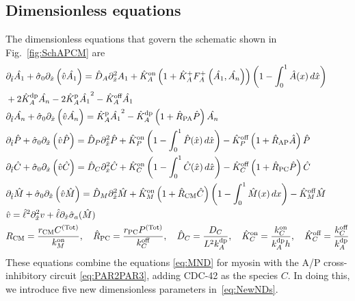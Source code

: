 \documentclass[11pt]{article}
\newcommand{\6}[1]{#1_{\text{6}}}
\newcommand{\3}[1]{#1_{\text{3}}}
\newcommand{\Tot}[1]{#1^\text{(Tot)}}
\newcommand{\A}[1]{#1_A}
\begin{document}
\subsection{Dimensionless equations}
The dimensionless equations that govern the schematic shown in Fig.\ \ref{fig:SchAPCM} are 
\begin{subequations}
\label{eq:Everything}
\begin{align}
\nonumber
&\Dthat \hat{\MA}  +\hat{\sigma}_0  \Dxhat \left(\hat{v} \hat{\MA} \right) = \DhatA \Dxhat^2 \MA +\KhatonA \left(1+\KhatfA \A{F}^+\left(\hat{\MA},\hat{\PA}\right)\right)\left(1 - \int_0^1 \hat{A}(x) \, d\hat{x} \right) \\ 
&+ 2\KhatdpA \hat{\PA}-2\KhatpA \hat{\MA}^2 - \KhatoffA \hat{\MA} \\ 
&\Dthat \hat{\PA} +\hat{\sigma}_0  \Dxhat \left(\hat{v} \hat{\PA} \right)  =\KhatpA \hat{\MA}^2- \KhatdpA \left(1+\hat{R}_\text{PA}\hat{P}\right) \hat{\PA} \\ 
&\Dthat \hat{P} +\hat{\sigma}_0  \Dxhat \left(\hat{v} \hat{P} \right)   =\DhatP \Dxhat^2 \hat{P} +\KhatonP \left(1 - \int_0^1 \hat{P}(\hat x) \, d\hat{x} \right)  - \KhatoffP \left(1+\hat{R}_\text{AP}\hat A\right) \hat{P} \\ 
\label{eq:26c}
&\Dthat \hat{C} +\hat{\sigma}_0  \Dxhat \left(\hat{v} \hat{C} \right) =\DhatC \Dxhat^2 \hat{C} +\KhatonC \left(1 - \int_0^1 \hat{C}(\hat x) \, d\hat{x} \right)  - \KhatoffC \left(1+\hat{R}_\text{PC}\hat P\right)\hat{C} \\ 
&\Dthat \hat{M} +\hat{\sigma}_0  \Dxhat \left(\hat{v} \hat{M} \right) =\hat{D}_M \Dxhat^2 \hat{M} +\KhatonM \left(1+\hat{R}_\text{CM} \hat C\right) \left(1-\int_0^1  \hat{M}(x) \, dx\right)- \KhatoffM \hat{M}\\
&\hat{v} = \hat{\ell}^2 \Dxhat^2 v +\hat{\ell} \Dxhat \hat{\sigma}_a(\hat{M})\\
\label{eq:NewNDs}
&R_\text{CM}=\frac{r_\text{CM}\Tot{C}}{\kon_M},\quad \hat{R}_\text{PC}=\frac{r_\text{PC}\Tot{P}}{\koff_C},\quad \DhatC=\frac{D_C}{L^2 \kdp_A},\quad \KhatonC=\frac{\kon_C}{\kdp_A h},\quad \KhatoffC=\frac{\koff_C}{\kdp_A}
\end{align}
\end{subequations}
These equations combine the equations \eqref{eq:MND} for myosin with the A/P cross-inhibitory circuit \eqref{eq:PAR2PAR3}, adding CDC-42 as the species $C$. In doing this, we introduce five new dimensionless parameters in\ \eqref{eq:NewNDs}. 
\end{document}
